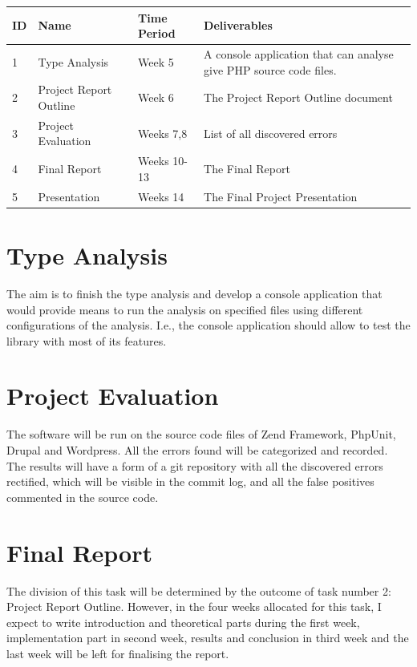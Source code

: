 \begin{center}
    \begin{tabular}{ | l | l | l | p{7cm} |}
    \hline
    ID & Name & Time Period & Deliverables\\ \hline
    
    1 & Type Analysis & Week 5 & 
        A console application that can analyse give PHP source code files.
    \\ \hline
        
    2 & Project Report Outline & Week 6 & 
        The Project Report Outline document \\ \hline
        
    3 & Project Evaluation & Weeks 7,8 &
        List of all discovered errors \\ \hline
        
    4 & Final Report & Weeks 10-13 &
        The Final Report \\ \hline        
        
    5 & Presentation & Weeks 14 &
        The Final Project Presentation \\ \hline                

    \end{tabular}
\end{center}

\section{Type Analysis}
The aim is to finish the type analysis and develop a 
console application that would provide means to run 
the analysis on specified files using different 
configurations of the analysis. I.e., 
the console application should allow to test the 
library with most of its features.

\section{Project Evaluation}
The software will be run on the source code files of 
Zend Framework, PhpUnit, Drupal and Wordpress. 
All the errors found will be categorized and recorded. 
The results will have a form of a git repository with 
all the discovered errors rectified, which will be visible 
in the commit log, and all the false positives commented in 
the source code.

\section{Final Report}
The division of this task will be determined by the outcome of 
task number 2: Project Report Outline. However, in the four 
weeks allocated for this task, I expect to write 
introduction and theoretical parts during the first week, 
implementation part in second week, 
results and conclusion in third week and 
the last week will be left for finalising the report.

